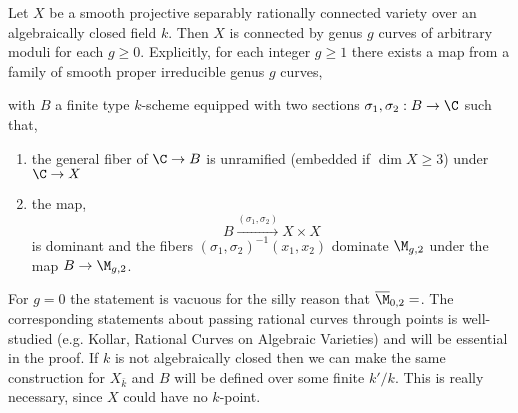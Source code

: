 \documentclass[12pt]{article}
\begin{document}
\begin{theorem}
Let $X$ be a smooth projective separably rationally connected variety over an algebraically closed field $k$. Then $X$ is connected by genus $g$ curves of arbitrary moduli for each $g \ge 0$. Explicitly, for each integer $g \ge 1$ there exists a map from a family of smooth proper irreducible genus $g$ curves,
\begin{center}
\end{center}
with $B$ a finite type $k$-scheme equipped with two sections $\sigma_1, \sigma_2 : B \to \C$ such that,
\begin{enumerate}
\item the general fiber of $\C \to B$ is unramified (embedded if $\dim{X} \ge 3$) under $\C \to X$ 

\item the map,
\[ B \xrightarrow{(\sigma_1, \sigma_2)} X \times X \]
is dominant and the fibers $(\sigma_1, \sigma_2)^{-1}(x_1, x_2)$ dominate $\M_{g,2}$ under the map $B \to \M_{g,2}$.
\end{enumerate} 
\end{theorem}

\begin{rmk}
For $g = 0$ the statement is vacuous for the silly reason that $\overline{\M}_{0,2} = \empty$. The corresponding statements about passing rational curves through points is well-studied (e.g. Kollar, Rational Curves on Algebraic Varieties) and will be essential in the proof.
If $k$ is not algebraically closed then we can make the same construction for $X_{\bar{k}}$ and $B$ will be defined over some finite $k'/k$. This is really necessary, since $X$ could have no $k$-point. 
\end{rmk}
\end{document}

